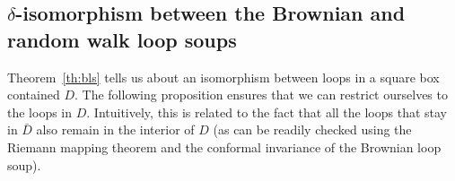 \documentclass[11pt]{article}
\newtheorem{theorem}{Theorem}[section]
\begin{document}
\subsection{\texorpdfstring{$\delta$}{delta}-isomorphism between the Brownian and random walk loop soups}


Theorem~\ref{th:bls} tells us about an isomorphism between loops in a square box contained $D$. The following proposition ensures that we can restrict ourselves to the loops in $D$. Intuitively, this is related to the fact that all the loops that stay in $\bar D$  also remain in the interior of $D$ (as can be readily checked using the Riemann mapping theorem and the conformal invariance of the Brownian loop soup).
\end{document}
